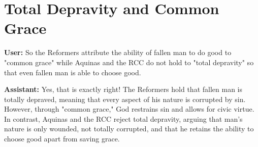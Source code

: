 \documentclass{article}
\begin{document}
\section{Total Depravity and Common Grace}

\textbf{User:} So the Reformers attribute the ability of fallen man to do good to "common grace" while Aquinas and the RCC do not hold to "total depravity" so that even fallen man is able to choose good.

\textbf{Assistant:} Yes, that is exactly right! The Reformers hold that fallen man is totally depraved, meaning that every aspect of his nature is corrupted by sin. However, through "common grace," God restrains sin and allows for civic virtue. In contrast, Aquinas and the RCC reject total depravity, arguing that man’s nature is only wounded, not totally corrupted, and that he retains the ability to choose good apart from saving grace.
\end{document}
